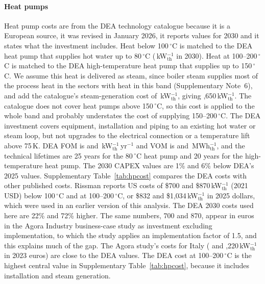 \documentclass[11pt]{article}
\begin{document}
\paragraph*{Heat pumps}
Heat pump costs are from the DEA technology catalogue\cite{dea2026processheat} because it is a European source, it was revised in January 2026, it reports values for 2030 and it states what the investment includes. Heat below 100\,$^\circ$C is matched to the DEA heat pump that supplies hot water up to 80\,$^\circ$C (\,kW$_\mathrm{th}^{-1}$ in 2030). Heat at 100--200\,$^\circ$C is matched to the DEA high-temperature heat pump that supplies up to 150\,$^\circ$C. We assume this heat is delivered as steam, since boiler steam supplies most of the process heat in the sectors with heat in this band (Supplementary Note~6), and add the catalogue's steam-generation cost of \,kW$_\mathrm{th}^{-1}$, giving ,650\,kW$_\mathrm{th}^{-1}$. The catalogue does not cover heat pumps above 150\,$^\circ$C, so this cost is applied to the whole band and probably understates the cost of supplying 150--200\,$^\circ$C. The DEA investment covers equipment, installation and piping to an existing hot water or steam loop, but not upgrades to the electrical connection or a temperature lift above 75\,K. DEA FOM is  and \,kW$_\mathrm{th}^{-1}$\,yr$^{-1}$ and VOM is  and \,MWh$_\mathrm{th}^{-1}$, and the technical lifetimes are 25 years for the 80\,$^\circ$C heat pump and 20 years for the high-temperature heat pump. The 2030 CAPEX values are 1\% and 6\% below DEA's 2025 values. Supplementary Table~\ref{tab:hpcost} compares the DEA costs with other published costs. Rissman\cite{rissman2020} reports US costs of \$700 and \$870\,kW$_\mathrm{th}^{-1}$ (2021 USD) below 100\,$^\circ$C and at 100--200\,$^\circ$C, or \$832 and \$1,034\,kW$_\mathrm{th}^{-1}$ in 2025 dollars, which were used in an earlier version of this analysis. The DEA 2030 costs used here are 22\% and 72\% higher. The same numbers, 700 and 870, appear in euros in the Agora Industry business-case study as investment excluding implementation, to which the study applies an implementation factor of 1.5\cite{agora2026business}, and this explains much of the gap. The Agora study's costs for Italy ( and ,220\,kW$_\mathrm{th}^{-1}$ in 2023 euros) are close to the DEA values. The DEA cost at 100--200\,$^\circ$C is the highest central value in Supplementary Table~\ref{tab:hpcost}, because it includes installation and steam generation.
\end{document}
